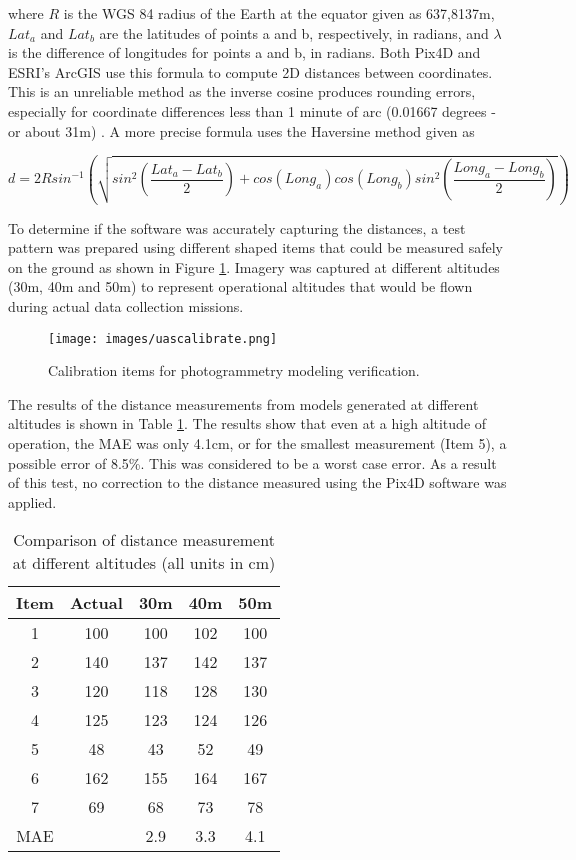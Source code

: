 \noindent
where $R$ is the WGS 84 radius of the Earth at the equator given as 637,8137m, $Lat_{a}$ and $Lat_{b}$ are the latitudes of points a and b, respectively, in radians, and $\lambda$ is the difference of longitudes for points a and b, in radians.  Both Pix4D and ESRI's ArcGIS use this formula to compute 2D distances between coordinates. This is an unreliable method as the inverse cosine produces rounding errors, especially for coordinate differences less than 1 minute of arc (0.01667 degrees - or about 31m) \citep{Sinnott1984}. A more precise formula uses the Haversine method given as 

\begin{equation}
\label{eq:distHaversine}
d = 2Rsin^{-1}\left (\sqrt{ sin^{2}\left ( \frac{Lat_{a}-Lat_{b}}{2} \right ) + cos(Long_{a})cos(Long_{b})sin^{2} \left ( \frac{Long_{a}-Long_{b}}{2} \right ) } \right )
\end{equation}

To determine if the software was accurately capturing the distances, a test pattern was prepared using different shaped items that could be measured safely on the ground as shown in Figure \ref{fig:uascalibration}. Imagery was captured at different altitudes (30m, 40m and 50m) to represent operational altitudes that would be flown during actual data collection missions.

\begin{figure}[H]
\texttt{[image: images/uascalibrate.png]} 
\caption{Calibration items for photogrammetry modeling verification.}
\label{fig:uascalibration}
\end{figure}

The results of the distance measurements from models generated at different altitudes is shown in Table \ref{tab:uascalibrate}. The results show that even at a high altitude of operation, the MAE was only 4.1cm, or for the smallest measurement (Item 5), a possible error of 8.5\%. This was considered to be a worst case error. As a result of this test, no correction to the distance measured using the Pix4D software was applied.

%
\begin{table}[H]
\centering
\caption[Comparison of distance measurement at different altitudes]{Comparison of distance measurement at different altitudes (all units in cm)}
\label{tab:uascalibrate}
\begin{tabular}{@{}ccccc@{}}
\toprule
\textbf{Item} & \textbf{Actual} & \textbf{30m} & \textbf{40m} & \textbf{50m} \\ \midrule
1 & 100 & 100 & 102 & 100 \\
2 & 140 & 137 & 142 & 137 \\
3 & 120 & 118 & 128 & 130 \\
4 & 125 & 123 & 124 & 126 \\
5 & 48 & 43 & 52 & 49 \\
6 & 162 & 155 & 164 & 167 \\
7 & 69 & 68 & 73 & 78 \\
MAE &  & 2.9 & 3.3 & 4.1 \\ \bottomrule
\end{tabular}
\end{table}

